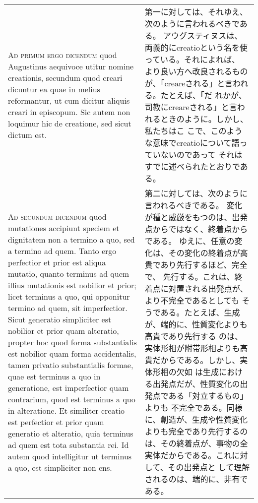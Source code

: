 \documentclass[10pt]{jsarticle} %
\begin{document}
\begin{longtable}{p{21em}p{21em}}
\\

{\scshape Ad primum ergo dicendum} quod Augustinus
 aequivoce utitur nomine creationis, secundum quod creari dicuntur ea
 quae in melius reformantur, ut cum dicitur aliquis creari in
 episcopum. Sic autem non loquimur hic de creatione, sed sicut dictum
 est.

&

第一に対しては、それゆえ、次のように言われるべきである。
アウグスティヌスは、両義的にcreatioという名を使っている。それによれば、
 より良い方へ改良されるものが、「creareされる」と言われる。たとえば、「だ
 れかが、司教にcreareされる」と言われるときのように。しかし、私たちはこ
 こで、このような意味でcreatioについて語っていないのであって
それはすでに述べられたとおりである。


\\

{\scshape Ad secundum dicendum} quod mutationes
 accipiunt speciem et dignitatem non a termino a quo, sed a termino ad
 quem. Tanto ergo perfectior et prior est aliqua mutatio, quanto
 terminus ad quem illius mutationis est nobilior et prior; licet
 terminus a quo, qui opponitur termino ad quem, sit imperfectior. Sicut
 generatio simpliciter est nobilior et prior quam alteratio, propter hoc
 quod forma substantialis est nobilior quam forma accidentalis, tamen
 privatio substantialis formae, quae est terminus a quo in generatione,
 est imperfectior quam contrarium, quod est terminus a quo in
 alteratione. Et similiter creatio est perfectior et prior quam
 generatio et alteratio, quia terminus ad quem est tota substantia
 rei. Id autem quod intelligitur ut terminus a quo, est simpliciter non
 ens.

&

第二に対しては、次のように言われるべきである。
変化が種と威厳をもつのは、出発点からではなく、終着点からである。
ゆえに、任意の変化は、その変化の終着点が高貴であり先行するほど、完全で、
 先行する。これは、終着点に対置される出発点が、より不完全であるとしても
 そうである。たとえば、生成が、端的に、性質変化よりも高貴であり先行する
 のは、実体形相が附帯形相よりも高貴だからである。しかし、実体形相の欠如
 は生成における出発点だが、性質変化の出発点である「対立するもの」よりも
 不完全である。同様に、創造が、生成や性質変化よりも完全であり先行するの
 は、その終着点が、事物の全実体だからである。これに対して、その出発点と
 して理解されるのは、端的に、非有である。


\\


\end{longtable}
\end{document}
